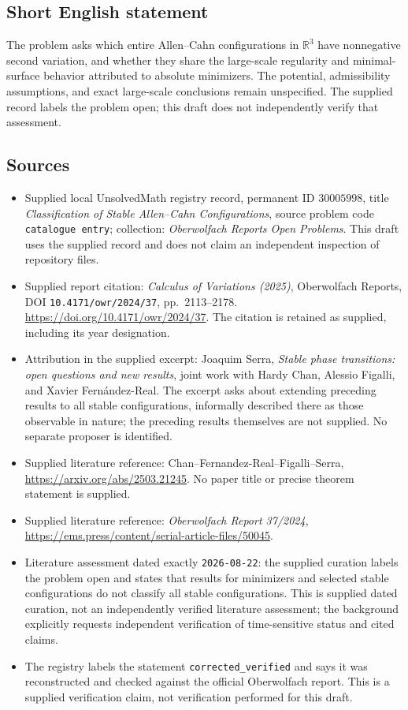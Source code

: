 \documentclass[11pt]{article}
\newcommand{\R}{\mathbb{R}}
\begin{document}
\subsection{Short English statement}
The problem asks which entire Allen--Cahn configurations in \(\R^3\) have nonnegative second variation, and whether they share the large-scale regularity and minimal-surface behavior attributed to absolute minimizers. The potential, admissibility assumptions, and exact large-scale conclusions remain unspecified. The supplied record labels the problem open; this draft does not independently verify that assessment.
\subsection{Sources}
\begin{itemize}
\item Supplied local UnsolvedMath registry record, permanent ID \(30005998\), title \emph{Classification of Stable Allen--Cahn Configurations}, source problem code \texttt{catalogue entry}; collection: \emph{Oberwolfach Reports Open Problems}. This draft uses the supplied record and does not claim an independent inspection of repository files.
\item Supplied report citation: \emph{Calculus of Variations (2025)}, Oberwolfach Reports, DOI \texttt{10.4171/owr/2024/37}, pp.\ 2113--2178. \url{https://doi.org/10.4171/owr/2024/37}. The citation is retained as supplied, including its year designation.
\item Attribution in the supplied excerpt: Joaquim Serra, \emph{Stable phase transitions: open questions and new results}, joint work with Hardy Chan, Alessio Figalli, and Xavier Fern\'andez-Real. The excerpt asks about extending preceding results to all stable configurations, informally described there as those observable in nature; the preceding results themselves are not supplied. No separate proposer is identified.
\item Supplied literature reference: Chan--Fernandez-Real--Figalli--Serra, \url{https://arxiv.org/abs/2503.21245}. No paper title or precise theorem statement is supplied.
\item Supplied literature reference: \emph{Oberwolfach Report 37/2024}, \url{https://ems.press/content/serial-article-files/50045}.
\item Literature assessment dated exactly \texttt{2026-08-22}: the supplied curation labels the problem open and states that results for minimizers and selected stable configurations do not classify all stable configurations. This is supplied dated curation, not an independently verified literature assessment; the background explicitly requests independent verification of time-sensitive status and cited claims.
\item The registry labels the statement \texttt{corrected\_verified} and says it was reconstructed and checked against the official Oberwolfach report. This is a supplied verification claim, not verification performed for this draft.
\end{itemize}
\end{document}

